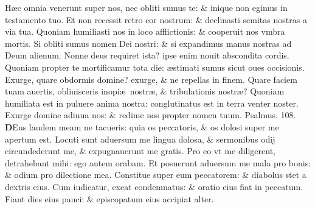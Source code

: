 \documentclass[a5paper,10pt]{book}
\def\ae{æ}
\begin{document}
\begin{multicols*}{2}
\newline \color{red} H\color{black}\ae c omnia venerunt super nos, nec obliti sumus te: \& inique non egimus in testamento tuo.
\newline \color{red} E\color{black}t non recessit retro cor nostrum: \& declinasti semitas nostras a via tua.
\newline \color{red} Q\color{black}uoniam humiliasti nos in loco afflictionis: \& cooperuit nos vmbra mortis.
\newline \color{red} S\color{black}i obliti sumus nomen Dei nostri: \& si expandimus manus nostras ad Deum alienum.
\newline \color{red} N\color{black}onne deus requiret ista? ipse enim nouit abscondita cordis.
\newline \color{red} Q\color{black}uoniam propter te mortificamur tota die: \ae stimati sumus sicut oues occisionis.
\newline \color{red} E\color{black}xurge, quare obdormis domine? exurge, \& ne repellas in finem.
\newline \color{red} Q\color{black}uare faciem tuam auertis, obliuisceris inopi\ae \ nostr\ae , \& tribulationis nostr\ae ?
\newline \color{red} Q\color{black}uoniam humiliata est in puluere anima nostra: conglutinatus est in terra venter noster.
\newline \color{red} E\color{black}xurge domine adiuua nos: \& redime nos propter nomen tuum.
\newline \color{red} Psalmus. \hypertarget{ps108}{108.} \color{black}
\vspace{-1em}
\lettrine[lines=2]{\bfseries \color{red} D}{}Eus laudem meam ne tacueris: quia os peccatoris, \& os dolosi super me apertum est.
\newline \color{red} L\color{black}ocuti sunt aduersum me lingua dolosa, \& sermonibus odij circundederunt me, \& expugnauerunt me gratis.
\newline \color{red} P\color{black}ro eo vt me diligerent, detrahebant mihi: ego autem orabam.
\newline \color{red} E\color{black}t posuerunt aduersum me mala pro bonis: \& odium pro dilectione mea.
\newline \color{red} C\color{black}onstitue super eum peccatorem: \& diabolus stet a dextris eius.
\newline \color{red} C\color{black}um iudicatur, exeat condemnatus: \& oratio eius fiat in peccatum.
\newline \color{red} F\color{black}iant dies eius pauci: \& episcopatum eius accipiat alter.

\end{multicols*}
\end{document}
